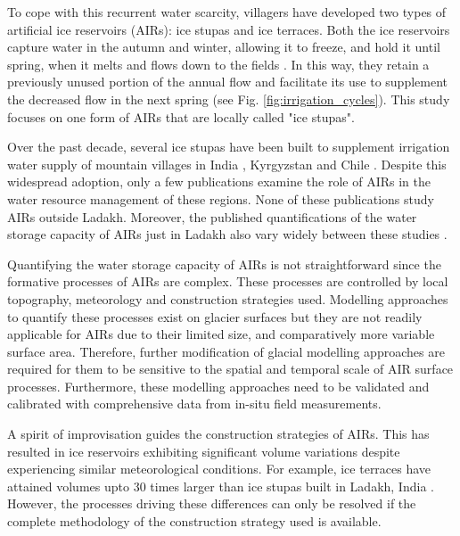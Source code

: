 To cope with this recurrent water scarcity, villagers have developed two types of artificial ice reservoirs
(AIRs): ice stupas and ice terraces. Both the ice reservoirs capture water in the autumn and winter, allowing it
to freeze, and hold it until spring, when it melts and flows down to the fields
\citep{ipccChapterHighMountain2019, vinceGlacierMan2009, clouseLadakhArtificialGlaciers2017,
nusserSociohydrologyArtificialGlaciers2019}. In this way, they retain a previously unused portion of the annual
flow and facilitate its use to supplement the decreased flow in the next spring (see Fig.
\ref{fig:irrigation_cycles}). This study focuses on one form of AIRs that are locally called "ice stupas".

Over the past decade, several ice stupas have been built to supplement irrigation water supply of mountain
villages in India \citep{wangchukIceStupaCompetition2020, palmerStoringFrozenWater2022,
aggarwalAdaptationClimateChange2021}, Kyrgyzstan \citep{bbcnewsBrightArtificialGlacier2020} and Chile
\citep{reutersConservationistsChileAim2021}. Despite this widespread adoption, only a few publications examine
the role of AIRs in the water resource management of these regions. None of these publications study AIRs
outside Ladakh. Moreover, the published quantifications of the water storage capacity of AIRs just in Ladakh
also vary widely between these studies \citep{norphelSnowWaterHarvesting2015, baglaArtificialGlaciersHelp1998}.

Quantifying the water storage capacity of AIRs is not straightforward since the formative processes of AIRs are
complex. These processes are controlled by local topography, meteorology and construction strategies used.
Modelling approaches to quantify these processes exist on glacier surfaces but they are not readily applicable
for AIRs due to their limited size, and comparatively more variable surface area. Therefore, further
modification of glacial modelling approaches are required for them to be sensitive to the spatial and temporal
scale of AIR surface processes. Furthermore, these modelling approaches need to be validated and calibrated with
comprehensive data from in-situ field measurements. 

A spirit of improvisation guides the construction strategies of AIRs. This has resulted in ice reservoirs
exhibiting significant volume variations despite experiencing similar meteorological conditions. For example,
ice terraces have attained volumes upto 30 times larger than ice stupas built in Ladakh, India
\cite{nusserSociohydrologyArtificialGlaciers2019}. However, the processes driving these differences can only be
resolved if the complete methodology of the construction strategy used is available.

